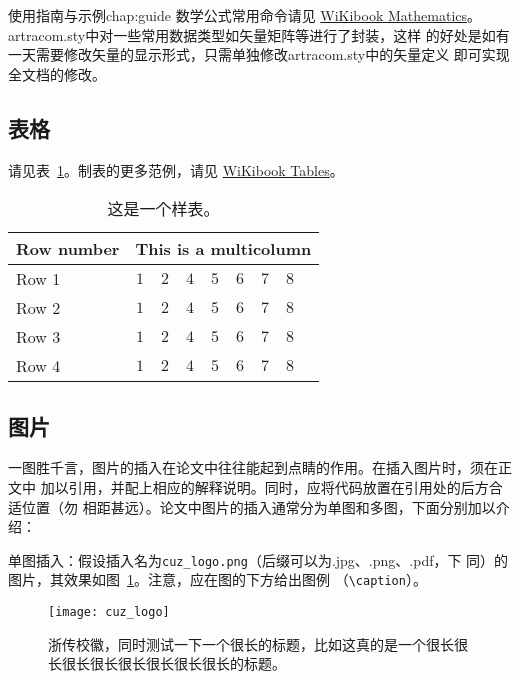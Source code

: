 \begin{cuzchapter}{使用指南与示例}{chap:guide}
	数学公式常用命令请见
	\href{https://en.wikibooks.org/wiki/LaTeX/Mathematics}{WiKibook
		Mathematics}。 artracom.sty中对一些常用数据类型如矢量矩阵等进行了封装，这样
	的好处是如有一天需要修改矢量的显示形式，只需单独修改artracom.sty中的矢量定义
	即可实现全文档的修改。

	\subsection{表格}\label{sub:tables}

	请见表~\ref{tab:sample}。制表的更多范例，请见
	\href{https://en.wikibooks.org/wiki/LaTeX/Tables}{WiKibook Tables}。
	\begin{table}[!htbp]
		\caption[样表]{这是一个样表。}
		\label{tab:sample}
		\centering
		\footnotesize%
		\setlength{\tabcolsep}{4pt}%
		\renewcommand{\arraystretch}{1.2}%
		\begin{tabular}{lcccccccc}
			\hline
			Row number & \multicolumn{8}{c}{This is a multicolumn}                                     \\
			\hline
			Row 1      & $1$                                       & $2$ & $4$ & $5$ & $6$ & $7$ & $8$ \\
			Row 2      & $1$                                       & $2$ & $4$ & $5$ & $6$ & $7$ & $8$ \\
			Row 3      & $1$                                       & $2$ & $4$ & $5$ & $6$ & $7$ & $8$ \\
			Row 4      & $1$                                       & $2$ & $4$ & $5$ & $6$ & $7$ & $8$ \\
			\hline
		\end{tabular}
	\end{table}

	\subsection{图片}\label{sub:images}

	一图胜千言，图片的插入在论文中往往能起到点睛的作用。在插入图片时，须在正文中
	加以引用，并配上相应的解释说明。同时，应将代码放置在引用处的后方合适位置（勿
	相距甚远）。论文中图片的插入通常分为单图和多图，下面分别加以介绍：

	单图插入：假设插入名为\verb|cuz_logo.png|（后缀可以为.jpg、.png、.pdf，下
	同）的图片，其效果如图~\ref{fig:cuz_logo}。注意，应在图的下方给出图例
	（\verb|\caption|）。
	\begin{figure}[h]
		\centering
		\texttt{[image: cuz\_logo]}
		\caption[浙传校徽]{浙传校徽，同时测试一下一个很长的标题，比如这真的是一个很长很长很长很长很长很长很长很长的标题。}
		\label{fig:cuz_logo}
	\end{figure}


\end{cuzchapter}
